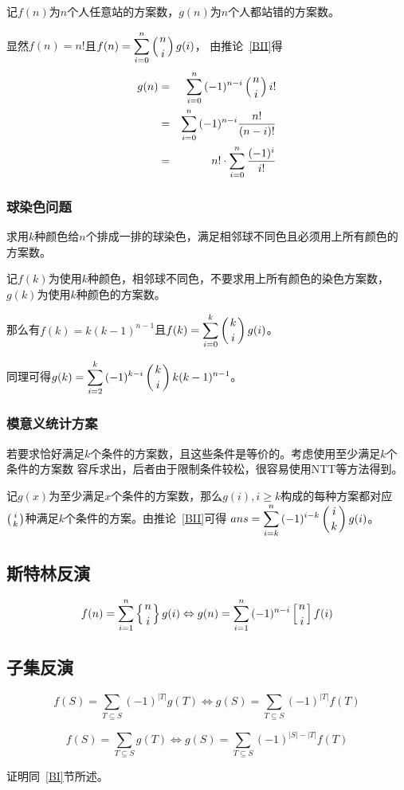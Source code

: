 记$f(n)$为$n$个人任意站的方案数，$g(n)$为$n$个人都站错的方案数。

显然$f(n)=n!$且$\displaystyle f(n)=\sum_{i=0}^n{\left(n \atop i\right) g(i)}$，
由推论~\ref{BII}得
\begin{eqnarray*}
	g(n)&=&\sum_{i=0}^n{(-1)^{n-i}\left(n \atop i\right)i!}\\
	&=&\sum_{i=0}^n{(-1)^{n-i}\frac{n!}{(n-i)!}}\\
	&=&n!\cdot\sum_{i=0}^n{\frac{(-1)^i}{i!}}
\end{eqnarray*}
\subsubsection{球染色问题}
求用$k$种颜色给$n$个排成一排的球染色，满足相邻球不同色且必须用上所有颜色的方案数。

记$f(k)$为使用$k$种颜色，相邻球不同色，不要求用上所有颜色的染色方案数，
$g(k)$为使用$k$种颜色的方案数。

那么有$f(k)=k(k-1)^{n-1}$且$\displaystyle f(k)=\sum_{i=0}^k{\left(k \atop i\right)g(i)}$。

同理可得$\displaystyle g(k)=\sum_{i=2}^k{(-1)^{k-i}\left(k \atop i\right)k(k-1)^{n-1}}$。
\subsubsection{模意义统计方案}
若要求恰好满足$k$个条件的方案数，且这些条件是等价的。考虑使用至少满足$k$个条件的方案数
容斥求出，后者由于限制条件较松，很容易使用NTT等方法得到。

记$g(x)$为至少满足$x$个条件的方案数，那么$g(i),i\geq k$构成的每种方案都对应
$\left(i \atop k\right)$种满足$k$个条件的方案。由推论~\ref{BII}可得
$ans=\displaystyle \sum_{i=k}^n{(-1)^{i-k}\left(i \atop k\right)g(i)}$。

\subsection{斯特林反演}
\begin{theorem}
    \begin{displaymath}
        f(n)=\sum_{i=1}^n{\left\{n \atop i\right\}g(i)}
        \Leftrightarrow
        g(n)=\sum_{i=1}^n{(-1)^{n-i}\left[n \atop i\right]f(i)}
    \end{displaymath}
\end{theorem}
\subsection{子集反演}
\begin{theorem}
	\begin{displaymath}
		f(S)=\sum_{T\subseteq S}{(-1)^{|T|}g(T)}
		\Leftrightarrow
		g(S)=\sum_{T\subseteq S}{(-1)^{|T|}f(T)}
	\end{displaymath}
\end{theorem}
\begin{inference}
	\begin{displaymath}
		f(S)=\sum_{T\subseteq S}{g(T)}
		\Leftrightarrow
		g(S)=\sum_{T\subseteq S}{(-1)^{|S|-|T|}f(T)}
	\end{displaymath}
\end{inference}
证明同~\ref{BI}节所述。
